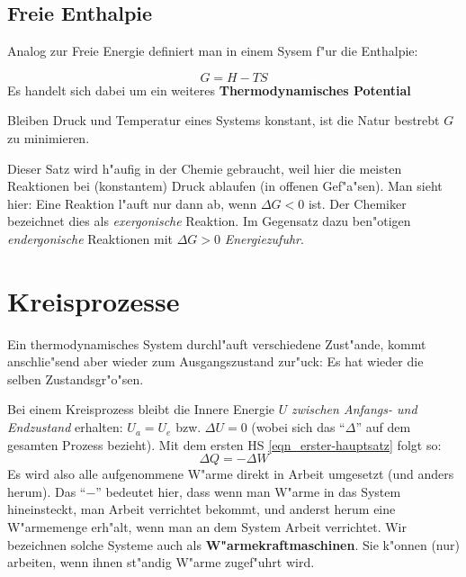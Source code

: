 \subsection{Freie Enthalpie}
\label{kap_freie-enthalpie}

Analog zur Freie Energie definiert man in einem Sysem f"ur die Enthalpie:
\begin{Def}
   \begin{equation}
      \label{eq:207}
      G = H - TS
   \end{equation}
Es handelt sich dabei um ein weiteres \textbf{Thermodynamisches Potential}
\end{Def}



\begin{Wichtig}
    Bleiben
   Druck und Temperatur eines Systems konstant, ist die Natur
   bestrebt $G$ zu minimieren.
\end{Wichtig}
Dieser Satz wird h"aufig in der Chemie gebraucht, weil hier die meisten
Reaktionen bei (konstantem) Druck ablaufen (in offenen Gef"a"sen). Man
sieht hier: Eine Reaktion l"auft nur dann ab, wenn $\Delta G < 0$
ist. Der Chemiker bezeichnet dies als \emph{exergonische}
Reaktion. Im Gegensatz dazu ben"otigen \emph{endergonische} Reaktionen
mit $\Delta G > 0$ \emph{Energiezufuhr}.









\section{Kreisprozesse}
\label{kap_kreisprozesse}

\begin{Def}
    Ein thermodynamisches System
   durchl"auft verschiedene Zust"ande, kommt anschlie"send aber wieder
   zum Ausgangszustand zur"uck: Es hat wieder die selben
   Zustandsgr"o"sen.
\end{Def}

Bei einem Kreisprozess bleibt die Innere Energie $U$ \emph{zwischen
  Anfangs- und Endzustand} erhalten: $U_a = U_e$ bzw. $\Delta U = 0$
(wobei sich das "`$\Delta $"' auf dem gesamten Prozess bezieht). Mit
dem ersten HS \eqref{eqn_erster-hauptsatz} folgt so:
$$
 \Delta Q = - \Delta W
$$
Es wird also alle aufgenommene W"arme direkt in Arbeit umgesetzt (und
anders herum). Das "`$-$"' bedeutet hier, dass wenn man W"arme in das
System hineinsteckt, man Arbeit verrichtet bekommt, und anderst herum
eine W"armemenge erh"alt, wenn man an dem System Arbeit verrichtet. Wir
bezeichnen solche Systeme auch als
\textbf{W"armekraftmaschinen}. Sie k"onnen
(nur) arbeiten, wenn ihnen st"andig W"arme zugef"uhrt wird.



